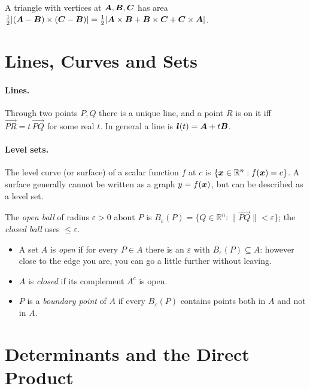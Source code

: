 \begin{example}
A triangle with vertices at $\vect{A},\vect{B},\vect{C}$ has area $\tfrac12|(\vect{A}-\vect{B})\times(\vect{C}-\vect{B})| = \tfrac12|\vect{A}\times\vect{B} + \vect{B}\times\vect{C} + \vect{C}\times\vect{A}|$.
\end{example}

\section{Lines, Curves and Sets}

\paragraph{Lines.} Through two points $P,Q$ there is a unique line, and a point $R$ is on it iff $\overrightarrow{PR} = t\,\overrightarrow{PQ}$ for some real $t$. In general a line is $\lvect{l}(t) = \vect{A} + t\vect{B}$.

\paragraph{Level sets.} The level curve (or surface) of a scalar function $f$ at $c$ is $\{\bm{x}\in\mathbb{R}^n : f(\bm{x}) = c\}$. A surface generally cannot be written as a graph $y=f(\bm{x})$, but can be described as a level set.

\begin{definition}
The \emph{open ball} of radius $\varepsilon>0$ about $P$ is $B_\varepsilon(P) = \{Q\in\mathbb{R}^n : \|\overrightarrow{PQ}\|<\varepsilon\}$; the \emph{closed ball} uses $\le\varepsilon$.
\begin{itemize}
    \item A set $A$ is \emph{open} if for every $P\in A$ there is an $\varepsilon$ with $B_\varepsilon(P)\subseteq A$: however close to the edge you are, you can go a little further without leaving.
    \item $A$ is \emph{closed} if its complement $A^c$ is open.
    \item $P$ is a \emph{boundary point} of $A$ if every $B_\varepsilon(P)$ contains points both in $A$ and not in $A$.
\end{itemize}
\end{definition}

\section{Determinants and the Direct Product}

